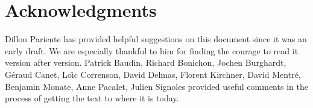 \documentclass{frama-c-book}
\begin{document}

\section*{Acknowledgments}

Dillon Pariente has provided helpful suggestions on this document
since it was an early draft. We are especially thankful to him for
finding the courage to read it version after version.
Patrick Baudin, Richard Bonichon,
Jochen Burghardt,
G\'eraud Canet, Lo\"\i c Correnson,
David Delmas, Florent Kirchner, David Mentr\'e, Benjamin Monate, Anne Pacalet,
Julien Signoles provided useful comments in the process of
getting the text to where it is today.



\end{document}

